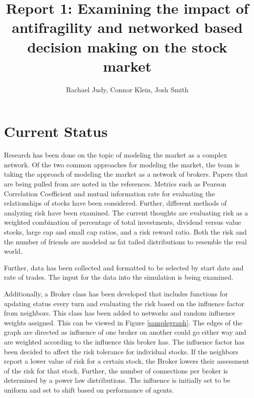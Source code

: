 \documentclass[letterpaper, 10 pt, proceedings]{ieeetran}  %
\title{\LARGE \bf
	Report 1: Examining the impact of antifragility and networked based decision making on the stock market
}
\author{Rachael Judy, Connor Klein, Josh Smith%
}
\begin{document}
	
	\maketitle
	\thispagestyle{empty}
	\pagestyle{empty}
	
	
	\section{Current Status}
	Research has been done on the topic of modeling the market as a complex network. Of the two common approaches for modeling the market, the team is taking the approach of modeling the market as a network of brokers. Papers that are being pulled from are noted in the references. Metrics such as Pearson Correlation Coefficient and mutual information rate for evaluating the relationships of stocks have been considered. Further, different methods of analyzing risk have been examined. The current thoughts are evaluating risk as a weighted combination of percentage of total investments, dividend versus value stocks, large cap and small cap ratios, and a risk reward ratio. Both the risk and the number of friends are modeled as fat tailed distributions to resemble the real world.
	
	
	Further, data has been collected and formatted to be selected by start date and rate of trades. The input for the data into the simulation is being examined.
	
	Additionally, a Broker class has been developed that includes functions for updating status every turn and evaluating the risk based on the influence factor from neighbors. This class has been added to networks and random influence weights assigned. This can be viewed in Figure \ref{samplegraph}. The edges of the graph are directed as influence of one broker on another could go either way and are weighted according to the influence this broker has. The influence factor has been decided to affect the risk tolerance for individual stocks. If the neighbors report a lower value of risk for a certain stock, the Broker lowers their assessment of the risk for that stock. Further, the number of connections per broker is determined by a power law distributions. The influence is initially set to be uniform and set to shift based on performance of agents.
	
\end{document}
